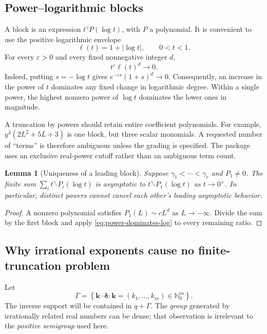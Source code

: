 \documentclass[11pt,a4paper]{article}
\numberwithin{equation}{section}
\newtheorem{lemma}[theorem]{Lemma}
\theoremstyle{definition}
\newcommand{\N}{\mathbb N}
\newcommand{\kk}{\boldsymbol k}
\newcommand{\deltaa}{\boldsymbol\delta}
\begin{document}
\subsection{Power--logarithmic blocks}
A block is an expression $t^\gamma P(\log t)$, with $P$ a polynomial.
It is convenient to use the positive logarithmic envelope
\begin{equation}
 \ell(t)=1+|\log t|,\qquad 0<t<1.
\end{equation}
For every $\varepsilon>0$ and every fixed nonnegative integer $d$,
\begin{equation}\label{eq:power-dominates-log}
 t^\varepsilon\ell(t)^d\longrightarrow0.
\end{equation}
Indeed, putting $s=-\log t$ gives $e^{-\varepsilon s}(1+s)^d\to0$.
Consequently, an increase in the power of $t$ dominates any fixed change
in logarithmic degree. Within a single power, the highest nonzero power
of $\log t$ dominates the lower ones in magnitude.

A truncation by powers should retain entire coefficient polynomials.
For example, $y^3(2L^2+5L+3)$ is one block, but three scalar monomials.
A requested number of ``terms'' is therefore ambiguous unless the grading
is specified. The package uses an exclusive real-power cutoff rather than
an ambiguous term count.

\begin{lemma}[Uniqueness of a leading block]\label{lem:uniqueness}
Suppose $\gamma_1<\cdots<\gamma_r$ and $P_1\ne0$.
The finite sum $\sum_i t^{\gamma_i}P_i(\log t)$ is asymptotic to
$t^{\gamma_1}P_1(\log t)$ as $t\to0^+$.
In particular, distinct powers cannot cancel each other's leading
asymptotic behavior.
\end{lemma}
\begin{proof}
A nonzero polynomial satisfies $P_1(L)\sim cL^d$ as $L\to-\infty$.
Divide the sum by the first block and apply
\eqref{eq:power-dominates-log} to every remaining ratio.
\end{proof}

\subsection{Why irrational exponents cause no finite-truncation problem}
Let
\begin{equation}\label{eq:semigroup}
 \Gamma=\left\{\kk\mathbin\cdot\deltaa:
         \kk=(k_1,\ldots,k_m)\in\N_0^m\right\}.
\end{equation}
The inverse support will be contained in $q+\Gamma$.
The \emph{group} generated by irrationally related real numbers can be
dense; that observation is irrelevant to the \emph{positive semigroup}
used here.
\end{document}
